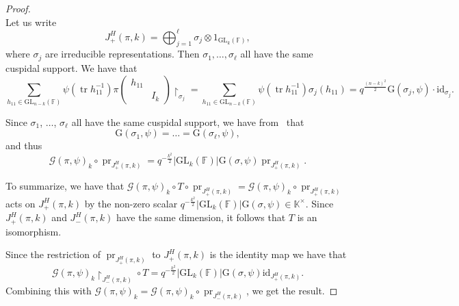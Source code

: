 \documentclass[12pt, reqno]{amsart}
\theoremstyle{definition}
\newcommand{\coefficientsField}{\mathbb{K}}
\newcommand{\multiplicativegroup}[1]{#1^{\times}}
\newcommand{\idmap}{\mathrm{id}}
\newcommand{\sizeof}[1]{\left|#1\right|}
\newcommand{\fieldCharacter}{\psi}
\newcommand{\IdentityMatrix}[1]{I_{#1}}
\newcommand{\trace}{\operatorname{tr}}
\newcommand{\GL}{\mathrm{GL}}
\newcommand{\finiteField}{\mathbb{F}}
\newcommand{\GaussSum}[2]{\mathcal{G}\left(#1, #2\right)}
\newcommand{\GaussSumScalar}[2]{\mathrm{G}\left(#1, #2\right)}
\newcommand{\pHJacquetModule}[2]{J^H_{+}\left(#1, #2\right)}
\newcommand{\nHJacquetModule}[2]{J^H_{-}\left(#1, #2\right)}
\newcommand{\ProjectionOperator}{\operatorname{pr}}
\begin{document}
\begin{proof}
\begin{displaymath}
		\end{displaymath}
		Let us write
		\begin{displaymath}
		\pHJacquetModule{\pi}{k} = \bigoplus_{j=1}^{\ell} \sigma_j \otimes 1_{\GL_k\left(\finiteField\right)},
		\end{displaymath}
		where $\sigma_j$ are irreducible representations. Then $\sigma_1,\dots,\sigma_{\ell}$ all have the same cuspidal support. We have that
		\begin{displaymath}
		\sum_{h_{11} \in \GL_{n-k}\left(\finiteField\right)} \fieldCharacter\left(\trace h_{11}^{-1}\right) \pi\begin{pmatrix}
			h_{11}\\
			& \IdentityMatrix{k}
		\end{pmatrix}\restriction_{\sigma_j} = \sum_{h_{11} \in \GL_{n-k}\left(\finiteField\right)} \fieldCharacter\left(\trace h_{11}^{-1}\right) \sigma_j\left(h_{11}\right) = q^{\frac{\left(n-k\right)^2}{2}} \GaussSumScalar{\sigma_j}{\fieldCharacter} \cdot \idmap_{\sigma_j}.
		\end{displaymath}
		
		Since $\sigma_1$, $\dots$, $\sigma_{\ell}$ all have the same cuspidal support, we have from~\cite[Corollary 4.5]{KurinczukMatringeSecherre2026} that
		\begin{displaymath}
		\GaussSumScalar{\sigma_1}{\fieldCharacter} = \dots = \GaussSumScalar{\sigma_{\ell}}{\fieldCharacter},
		\end{displaymath}
		and thus
		\begin{displaymath}
		\GaussSum{\pi}{\fieldCharacter}_k \circ \ProjectionOperator_{\pHJacquetModule{\pi}{k}} = q^{-\frac{k^2}{2}} \sizeof{\GL_k\left(\finiteField\right)} \GaussSumScalar{\sigma}{\fieldCharacter} \ProjectionOperator_{\pHJacquetModule{\pi}{k}}.
		\end{displaymath}
		
		To summarize, we have that $\GaussSum{\pi}{\fieldCharacter}_k \circ T \circ \ProjectionOperator_{\pHJacquetModule{\pi}{k}} = \GaussSum{\pi}{\fieldCharacter}_k \circ \ProjectionOperator_{\pHJacquetModule{\pi}{k}}$ acts on $\pHJacquetModule{\pi}{k}$ by the non-zero scalar $q^{-\frac{k^2}{2}} \sizeof{\GL_k\left(\finiteField\right)} \GaussSumScalar{\sigma}{\fieldCharacter} \in \multiplicativegroup{\coefficientsField}$. Since $\pHJacquetModule{\pi}{k}$ and $\nHJacquetModule{\pi}{k}$ have the same dimension, it follows that $T$ is an isomorphism.
		
		Since the restriction of  $\ProjectionOperator_{\pHJacquetModule{\pi}{k}}$ to $\pHJacquetModule{\pi}{k}$ is the identity map we have that
		\begin{displaymath}
			\GaussSum{\pi}{\fieldCharacter}_k \restriction_{\nHJacquetModule{\pi}{k}} \circ T = q^{-\frac{k^2}{2}} \sizeof{\GL_k\left(\finiteField\right)} \GaussSumScalar{\sigma}{\fieldCharacter} \idmap_{\pHJacquetModule{\pi}{k}}.
		\end{displaymath}
		Combining this with $\GaussSum{\pi}{\fieldCharacter}_k = \GaussSum{\pi}{\fieldCharacter}_k \circ \ProjectionOperator_{\nHJacquetModule{\pi}{k}}$, we get the result.
	\end{proof}
	
\end{document}
